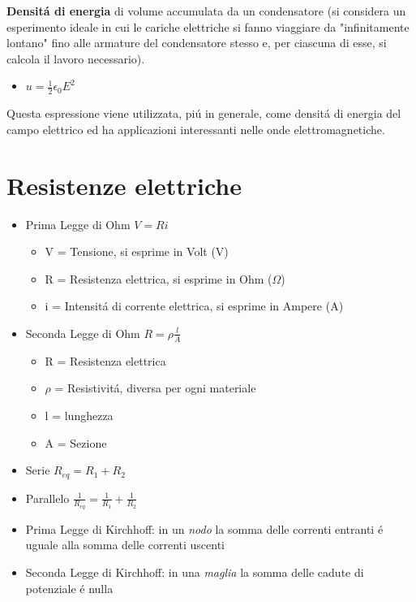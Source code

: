 \documentclass[17pt]{article}
\begin{document}
{\bf Densit\'a di energia} di volume accumulata da un condensatore (si considera un esperimento ideale in cui le cariche elettriche si fanno viaggiare da "infinitamente lontano" fino alle armature del condensatore stesso e, per ciascuna di esse, si calcola il lavoro necessario).

\begin{itemize}
	\item $u = \frac{1}{2} \epsilon_0E^2$
\end{itemize}

Questa espressione viene utilizzata, pi\'u in generale, come densit\'a di energia del campo elettrico ed ha applicazioni interessanti nelle onde elettromagnetiche.

\section{Resistenze elettriche}

\begin{itemize}
	\item Prima Legge di Ohm $V = Ri$
		\begin{itemize}
			\item V = Tensione, si esprime in Volt (V)
			\item R = Resistenza elettrica, si esprime in Ohm ($\Omega$)
			\item i = Intensit\'a di corrente elettrica, si esprime in Ampere (A)
		\end{itemize}
	\item Seconda Legge di Ohm $R=\rho\frac{l}{A}$
		\begin{itemize}
			\item R = Resistenza elettrica
			\item $\rho$ = Resistivit\'a, diversa per ogni materiale
			\item l = lunghezza
			\item A = Sezione
		\end{itemize}
	\item Serie $R_{eq} = R_1 + R_2$
	\item Parallelo $\frac{1}{R_{eq}} = \frac{1}{R_1} + \frac{1}{R_2}$
	\item Prima Legge di Kirchhoff: in un \emph{nodo} la somma delle correnti entranti \'e uguale alla somma delle correnti uscenti
	\item Seconda Legge di Kirchhoff: in una \emph{maglia} la somma delle cadute di potenziale \'e nulla
\end{itemize}
\end{document}
